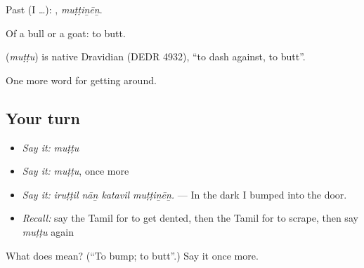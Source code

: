 Past (I …): , \emph{muṭṭiṉēṉ}.

Of a bull or a goat: to butt.

\begin{cousinweb}
\textbf{} (\emph{muṭṭu}) is native Dravidian (DEDR 4932), \textquotedblleft{}to dash against, to butt\textquotedblright{}.
\end{cousinweb}

\begin{grammarlens}[title={What you've built}]
One more word for getting around.
\end{grammarlens}

\subsection*{Your turn}
\begin{itemize}
\raggedright
  \item \emph{Say it:} \emph{muṭṭu}
  \item \emph{Say it:} \emph{muṭṭu}, once more
  \item \emph{Say it:} \emph{iruṭṭil nāṉ katavil muṭṭiṉēṉ.} — In the dark I bumped into the door.
  \item \emph{Recall:} say the Tamil for to get dented, then the Tamil for to scrape, then say \emph{muṭṭu} again
\end{itemize}

\begin{tcolorbox}[breakable,colback=teal!4,colframe=teal!35!black,title={Before you move on}]
What does  mean? (\textquotedblleft{}To bump; to butt\textquotedblright{}.) Say it once more.
\end{tcolorbox}
